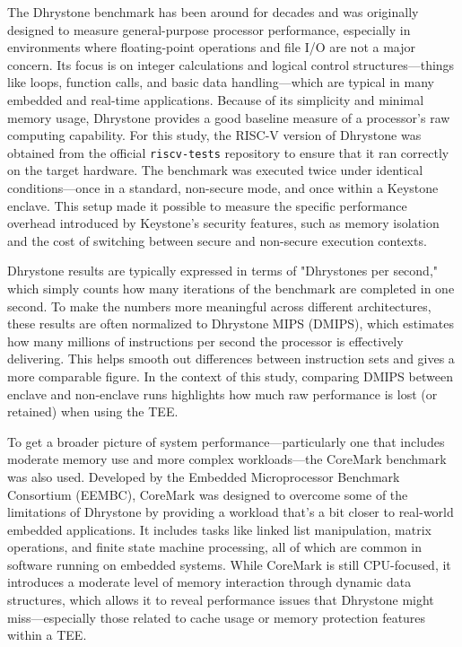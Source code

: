 The Dhrystone benchmark has been around for decades and was originally designed to measure general-purpose processor performance, especially in environments where floating-point operations and file I/O are not a major concern. Its focus is on integer calculations and logical control structures—things like loops, function calls, and basic data handling—which are typical in many embedded and real-time applications. Because of its simplicity and minimal memory usage, Dhrystone provides a good baseline measure of a processor’s raw computing capability. For this study, the RISC-V version of Dhrystone was obtained from the official \texttt{riscv-tests} repository to ensure that it ran correctly on the target hardware. The benchmark was executed twice under identical conditions—once in a standard, non-secure mode, and once within a Keystone enclave. This setup made it possible to measure the specific performance overhead introduced by Keystone’s security features, such as memory isolation and the cost of switching between secure and non-secure execution contexts.

Dhrystone results are typically expressed in terms of "Dhrystones per second," which simply counts how many iterations of the benchmark are completed in one second. To make the numbers more meaningful across different architectures, these results are often normalized to Dhrystone MIPS (DMIPS), which estimates how many millions of instructions per second the processor is effectively delivering. This helps smooth out differences between instruction sets and gives a more comparable figure. In the context of this study, comparing DMIPS between enclave and non-enclave runs highlights how much raw performance is lost (or retained) when using the TEE.

To get a broader picture of system performance—particularly one that includes moderate memory use and more complex workloads—the CoreMark benchmark was also used. Developed by the Embedded Microprocessor Benchmark Consortium (EEMBC), CoreMark was designed to overcome some of the limitations of Dhrystone by providing a workload that’s a bit closer to real-world embedded applications. It includes tasks like linked list manipulation, matrix operations, and finite state machine processing, all of which are common in software running on embedded systems. While CoreMark is still CPU-focused, it introduces a moderate level of memory interaction through dynamic data structures, which allows it to reveal performance issues that Dhrystone might miss—especially those related to cache usage or memory protection features within a TEE.

